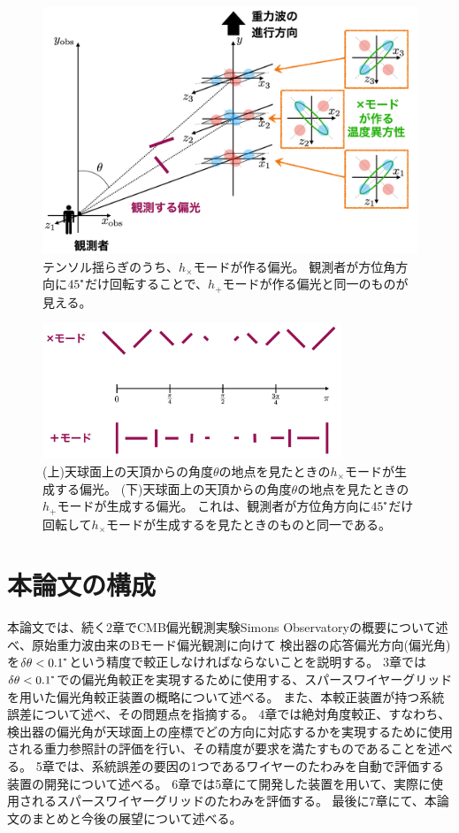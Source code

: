 \documentclass[../../main.tex]{subfiles}
\begin{document}
\begin{figure}[H]
    \centering
    \includegraphics[width=1.0\textwidth]{intro/tensor_polarization.pdf}
    \caption{テンソル揺らぎのうち、$h_{\times}$モードが作る偏光。
    観測者が方位角方向に$45\tcdegree$だけ回転することで、$h_{+}$モードが作る偏光と同一のものが見える。}
    \label{fig:tensor_polarization}
\end{figure}
\begin{figure}[H]
    \centering
    \includegraphics[width=0.8\textwidth]{intro/tensor_pol_theta.pdf}
    \caption{(上)天球面上の天頂からの角度$\theta$の地点を見たときの$h_{\times}$モードが生成する偏光。
    (下)天球面上の天頂からの角度$\theta$の地点を見たときの$h_{+}$モードが生成する偏光。
    これは、観測者が方位角方向に$45\tcdegree$だけ回転して$h_{\times}$モードが生成するを見たときのものと同一である。}
    \label{fig:tensor_polarization_theta}
\end{figure}

\section{本論文の構成}
本論文では、続く2章でCMB偏光観測実験Simons Observatoryの概要について述べ、原始重力波由来のBモード偏光観測に向けて
検出器の応答偏光方向(偏光角)を$\delta\theta < 0.1\tcdegree$という精度で較正しなければならないことを説明する。
3章では$\delta\theta<0.1\tcdegree$での偏光角較正を実現するために使用する、スパースワイヤーグリッドを用いた偏光角較正装置の概略について述べる。
また、本較正装置が持つ系統誤差について述べ、その問題点を指摘する。
4章では絶対角度較正、すなわち、検出器の偏光角が天球面上の座標でどの方向に対応するかを実現するために使用される重力参照計の評価を行い、その精度が要求を満たすものであることを述べる。
5章では、系統誤差の要因の1つであるワイヤーのたわみを自動で評価する装置の開発について述べる。
6章では5章にて開発した装置を用いて、実際に使用されるスパースワイヤーグリッドのたわみを評価する。
最後に7章にて、本論文のまとめと今後の展望について述べる。
\end{document}
